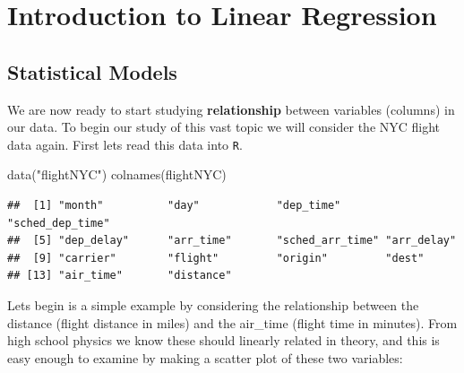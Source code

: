 \documentclass[
]{book}
\newenvironment{Shaded}{\begin{snugshade}}{\end{snugshade}}
\newcommand{\AttributeTok}[1]{\textcolor[rgb]{0.77,0.63,0.00}{#1}}
\newcommand{\DecValTok}[1]{\textcolor[rgb]{0.00,0.00,0.81}{#1}}
\newcommand{\FloatTok}[1]{\textcolor[rgb]{0.00,0.00,0.81}{#1}}
\newcommand{\FunctionTok}[1]{\textcolor[rgb]{0.00,0.00,0.00}{#1}}
\newcommand{\NormalTok}[1]{#1}
\newcommand{\SpecialCharTok}[1]{\textcolor[rgb]{0.00,0.00,0.00}{#1}}
\newcommand{\StringTok}[1]{\textcolor[rgb]{0.31,0.60,0.02}{#1}}
\theoremstyle{definition}
\theoremstyle{definition}
\theoremstyle{definition}
\theoremstyle{definition}
\theoremstyle{remark}
\begin{document}
\hypertarget{introduction-to-linear-regression}{%
\chapter{Introduction to Linear Regression}\label{introduction-to-linear-regression}}

\hypertarget{statistical-models}{%
\section{Statistical Models}\label{statistical-models}}

We are now ready to start studying \textbf{relationship} between variables (columns) in our data. To begin our study of this vast topic we will consider the NYC flight data again. First lets read this data into \texttt{R}.

\begin{Shaded}
\begin{Highlighting}[]
\FunctionTok{data}\NormalTok{(}\StringTok{"flightNYC"}\NormalTok{)}
\FunctionTok{colnames}\NormalTok{(flightNYC)}
\end{Highlighting}
\end{Shaded}

\begin{verbatim}
##  [1] "month"          "day"            "dep_time"       "sched_dep_time"
##  [5] "dep_delay"      "arr_time"       "sched_arr_time" "arr_delay"     
##  [9] "carrier"        "flight"         "origin"         "dest"          
## [13] "air_time"       "distance"
\end{verbatim}

Lets begin is a simple example by considering the relationship between the distance (flight distance in miles) and the air\_time (flight time in minutes). From high school physics we know these should linearly related in theory, and this is easy enough to examine by making a scatter plot of these two variables:

\begin{Shaded}
\end{Shaded}
\end{document}

